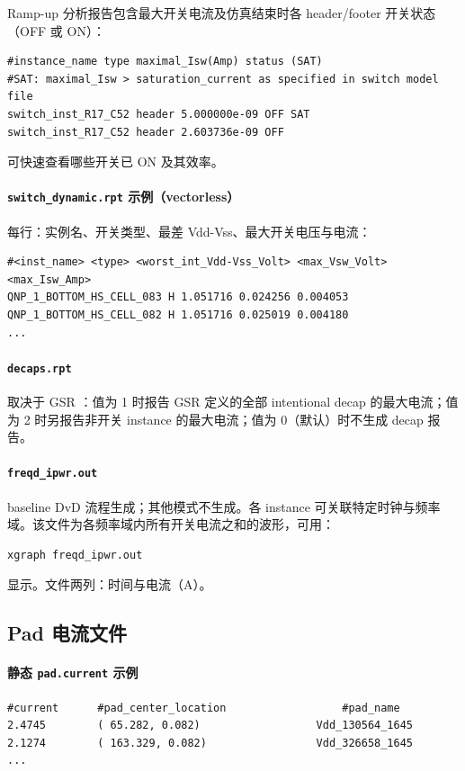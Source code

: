 Ramp-up 分析报告包含最大开关电流及仿真结束时各 header/footer 开关状态（OFF 或 ON）：
\begin{lstlisting}
#instance_name type maximal_Isw(Amp) status (SAT)
#SAT: maximal_Isw > saturation_current as specified in switch model file
switch_inst_R17_C52 header 5.000000e-09 OFF SAT
switch_inst_R17_C52 header 2.603736e-09 OFF
\end{lstlisting}
可快速查看哪些开关已 ON 及其效率。
\paragraph{\texttt{switch\_dynamic.rpt} 示例（vectorless）}
每行：实例名、开关类型、最差 Vdd-Vss、最大开关电压与电流：
\begin{lstlisting}
#<inst_name> <type> <worst_int_Vdd-Vss_Volt> <max_Vsw_Volt> <max_Isw_Amp>
QNP_1_BOTTOM_HS_CELL_083 H 1.051716 0.024256 0.004053
QNP_1_BOTTOM_HS_CELL_082 H 1.051716 0.025019 0.004180
...
\end{lstlisting}


\paragraph{\texttt{decaps.rpt}}
取决于 GSR ：值为 1 时报告 GSR 定义的全部 intentional decap 的最大电流；值为 2 时另报告非开关 instance 的最大电流；值为 0（默认）时不生成 decap 报告。

\paragraph{\texttt{freqd\_ipwr.out}}
baseline DvD 流程生成；其他模式不生成。各 instance 可关联特定时钟与频率域。该文件为各频率域内所有开关电流之和的波形，可用：
\begin{lstlisting}
xgraph freqd_ipwr.out
\end{lstlisting}
显示。文件两列：时间与电流（A）。

\subsection{Pad 电流文件}
\paragraph{静态 \texttt{pad.current} 示例}
\begin{lstlisting}
#current      #pad_center_location                  #pad_name
2.4745        ( 65.282, 0.082)                  Vdd_130564_1645
2.1274        ( 163.329, 0.082)                 Vdd_326658_1645
...
\end{lstlisting}

